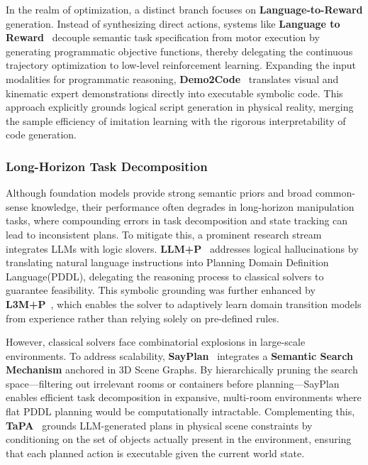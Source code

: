 \documentclass[acmsmall,screen,review,anonymous]{acmart}
\begin{document}
In the realm of optimization, a distinct branch focuses on \textbf{Language-to-Reward} generation. Instead of synthesizing direct actions, systems like \textbf{Language to Reward}~\cite{ma2023reward} decouple semantic task specification from motor execution by generating programmatic objective functions, thereby delegating the continuous trajectory optimization to low-level reinforcement learning\@. Expanding the input modalities for programmatic reasoning, \textbf{Demo2Code}~\cite{wang2023demo2code} translates visual and kinematic expert demonstrations directly into executable symbolic code. 
This approach explicitly grounds logical script generation in physical reality, merging the sample efficiency of imitation learning with the rigorous interpretability of code generation.

\subsubsection{Long-Horizon Task Decomposition}\label{sec:task_decomp}

Although foundation models provide strong semantic priors and broad common-sense knowledge, their performance often degrades in long-horizon manipulation tasks, where compounding errors in task decomposition and state tracking can lead to inconsistent plans. To mitigate this, a prominent research stream integrates LLMs with logic slovers. \textbf{LLM+P}~\cite{liu2023llmp} addresses logical hallucinations by translating natural language instructions into Planning Domain Definition Language(PDDL), delegating the reasoning process to classical solvers to guarantee feasibility. This symbolic grounding was further enhanced by \textbf{L3M+P}~\cite{agarwal2025l3mp}, which enables the solver to adaptively learn domain transition models from experience rather than relying solely on pre-defined rules.

However, classical solvers face combinatorial explosions in large-scale environments. To address scalability, \textbf{SayPlan}~\cite{sayplan2023} integrates a \textbf{Semantic Search Mechanism} anchored in 3D Scene Graphs. By hierarchically pruning the search space—filtering out irrelevant rooms or containers before planning—SayPlan enables efficient task decomposition in expansive, multi-room environments where flat PDDL planning would be computationally intractable. Complementing this, \textbf{TaPA}~\cite{wu2023tapa} grounds LLM-generated plans in physical scene constraints by conditioning on the set of objects actually present in the environment, ensuring that each planned action is executable given the current world state.
\end{document}
